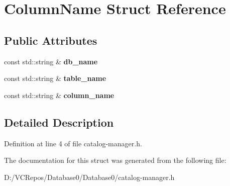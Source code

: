\hypertarget{struct_column_name}{}\section{Column\+Name Struct Reference}
\label{struct_column_name}
\subsection*{Public Attributes}
\begin{DoxyCompactItemize}
\item 
\mbox{\label{struct_column_name_a51eb7980f65d9f4814d80a1b6184d426}} 
const std\+::string \& {\bfseries db\+\_\+name}
\item 
\mbox{\label{struct_column_name_a8e4fe5f2b8a41e8ada01c04c817fe2e5}} 
const std\+::string \& {\bfseries table\+\_\+name}
\item 
\mbox{\label{struct_column_name_afdc40a20aa103aa07cdf5c74e9513f4f}} 
const std\+::string \& {\bfseries column\+\_\+name}
\end{DoxyCompactItemize}


\subsection{Detailed Description}


Definition at line 4 of file catalog-\/manager.\+h.



The documentation for this struct was generated from the following file\+:\begin{DoxyCompactItemize}
\item 
D\+:/\+V\+C\+Repos/\+Database0/\+Database0/catalog-\/manager.\+h\end{DoxyCompactItemize}

